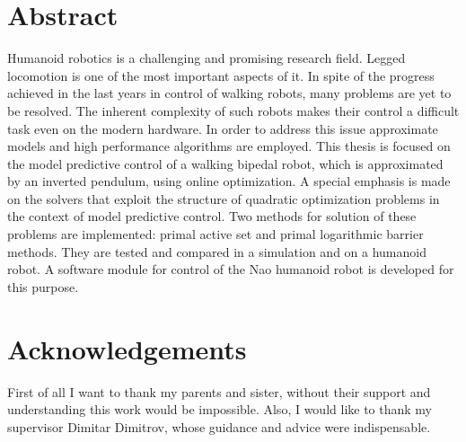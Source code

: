 \maketitle




\frontmatter



\cleardoublepage
{}
{}
\chapter*{Abstract}
Humanoid robotics is a challenging and promising research field. Legged locomotion
is one of the most important aspects of it. In spite of the progress achieved in 
the last years in control of walking robots, many problems are yet to be resolved. 
The inherent complexity of such robots makes their control a difficult task even 
on the modern hardware. In order to address this issue approximate models and
high performance algorithms are employed. This thesis is focused on the model 
predictive control of a walking bipedal robot, which is approximated by an inverted 
pendulum, using online optimization. A special emphasis is made on the solvers that 
exploit the structure of quadratic optimization problems in the context of model 
predictive control. Two methods for solution of these problems are implemented: 
primal active set and primal logarithmic barrier methods. They are tested and 
compared in a simulation and on a humanoid robot. A software module for control 
of the Nao humanoid robot is developed for this purpose.



\cleardoublepage
{}
{}
\chapter*{Acknowledgements}
First of all I want to thank my parents and sister, without their support and 
understanding this work would be impossible. Also, I would like to thank my
supervisor Dimitar Dimitrov, whose guidance and advice were indispensable.



